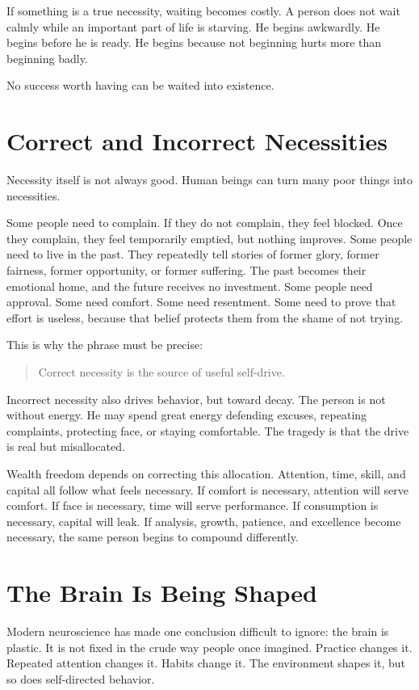 If something is a true necessity, waiting becomes costly. A person does not wait calmly while an important part of life is starving. He begins awkwardly. He begins before he is ready. He begins because not beginning hurts more than beginning badly.

No success worth having can be waited into existence.

\section*{Correct and Incorrect Necessities}

Necessity itself is not always good. Human beings can turn many poor things into necessities.

Some people need to complain. If they do not complain, they feel blocked. Once they complain, they feel temporarily emptied, but nothing improves. Some people need to live in the past. They repeatedly tell stories of former glory, former fairness, former opportunity, or former suffering. The past becomes their emotional home, and the future receives no investment. Some people need approval. Some need comfort. Some need resentment. Some need to prove that effort is useless, because that belief protects them from the shame of not trying.

This is why the phrase must be precise:

\begin{quote}
Correct necessity is the source of useful self-drive.
\end{quote}

Incorrect necessity also drives behavior, but toward decay. The person is not without energy. He may spend great energy defending excuses, repeating complaints, protecting face, or staying comfortable. The tragedy is that the drive is real but misallocated.

Wealth freedom depends on correcting this allocation. Attention, time, skill, and capital all follow what feels necessary. If comfort is necessary, attention will serve comfort. If face is necessary, time will serve performance. If consumption is necessary, capital will leak. If analysis, growth, patience, and excellence become necessary, the same person begins to compound differently.

\section*{The Brain Is Being Shaped}

Modern neuroscience has made one conclusion difficult to ignore: the brain is plastic. It is not fixed in the crude way people once imagined. Practice changes it. Repeated attention changes it. Habits change it. The environment shapes it, but so does self-directed behavior.

